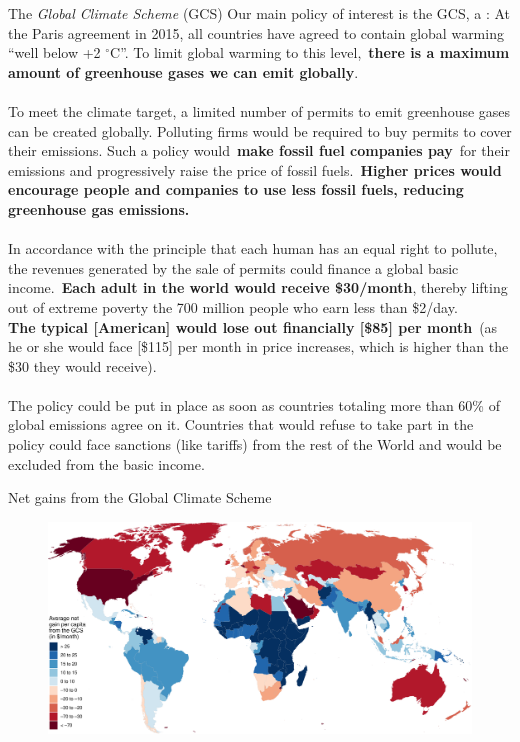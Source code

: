 \begin{framefont}{\small}
\begin{frame}{The \textit{Global Climate Scheme} (GCS)\label{GCS_def}}
\bbvs \ip Our main policy of interest is the GCS, a :
\bbvs \ip \small{ At the Paris agreement in 2015, all countries have agreed to contain global warming ``well below +2 $\mathrm{{}^\circ}$C''. To limit global warming to this level,~\textbf{there is a maximum amount of greenhouse gases we can emit globally}.\\ \quad \\
To meet the climate target, a limited number of permits to emit greenhouse gases can be created globally. Polluting firms would be required to buy permits to cover their emissions. Such a policy would~\textbf{make fossil fuel companies pay}~for their emissions and progressively raise the price of fossil fuels.~\textbf{Higher prices would encourage people and companies to use less fossil fuels, reducing greenhouse gas emissions.}\\ \quad \\
In accordance with the principle that each human has an equal right to pollute, the revenues generated by the sale of permits could finance a global basic income.~\textbf{Each adult in the world would receive \$30/month}, thereby lifting out of extreme poverty the 700 million people who earn less than \$2/day.\\ 
\textbf{The typical [American] would lose out financially [\$85] per month}~(as he or she would face [\$115] per month in price increases, which is higher than the \$30 they would receive). \\ \quad \\
The policy could be put in place as soon as countries totaling more than 60\% of global emissions agree on it. Countries that would refuse to take part in the policy could face sanctions (like tariffs) from the rest of the World and would be excluded from the basic income.}
\ee
\ee
\end{frame}

\begin{frame}{Net gains from the Global Climate Scheme\label{GCS_gain}}
    \begin{figure}
        \centering 
        \includegraphics[height=.9\textheight]{../figures/maps/mean_gain_2030.pdf} 
    \end{figure}
\end{frame}


\end{framefont}
